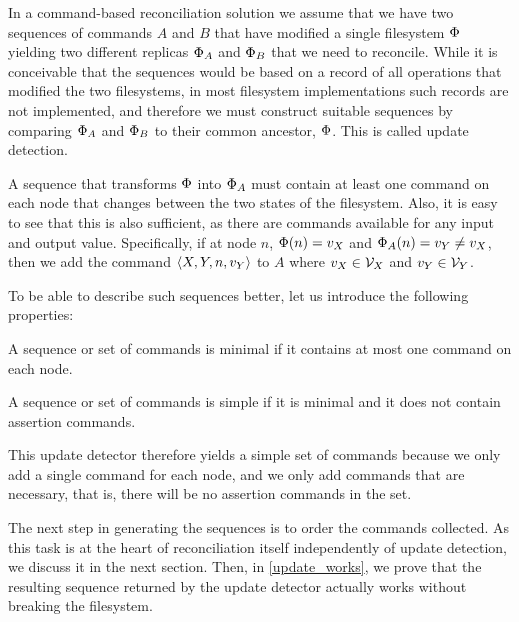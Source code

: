 
In a command-based reconciliation solution we assume that we have two sequences of commands
$A$ and $B$ that have modified a single filesystem $\Phi$ yielding two different replicas $\Phi_A$ and $\Phi_B$ that we
need to reconcile. While it is conceivable that the sequences would be based on a record of
all operations that modified the two filesystems, in most filesystem implementations
such records are not implemented, and therefore we must construct suitable sequences
by comparing $\Phi_A$ and $\Phi_B$ to their common ancestor, $\Phi$. This is called update detection.

A sequence that transforms $\Phi$ into $\Phi_A$ must contain at least one command on each node
that changes between the two states of the filesystem. Also, it is easy to see that this is also
sufficient, as there are commands available for any input and output value. 
Specifically, if at node $n$, $\Phi(n)=v_X$ and $\Phi_A(n)=v_Y\neq v_X$, then we add the command $\langle{X,Y,n,v_Y}\rangle$ to $A$
where $v_X\in\mathcal{V}_{X}$ and $v_Y\in\mathcal{V}_{Y}$.

To be able to describe such sequences better, let us introduce the following properties:

\begin{mydef}
A sequence or set of commands is minimal if it contains at most one command on each node.
\end{mydef}

\begin{mydef}
A sequence or set of commands is simple if it is minimal and it does not contain assertion commands.
\end{mydef}

This update detector therefore yields a simple set of commands because we only add a single command
for each node, and we only add commands that are necessary, that is, there will be no 
assertion commands in the set.

The next step in generating the sequences is to order the commands collected.
As this task is at the heart of reconciliation itself independently of update detection,
we discuss it in the next section.
Then, in \cref{update_works}, we prove that the resulting sequence 
returned by the update detector actually works without breaking the filesystem.
